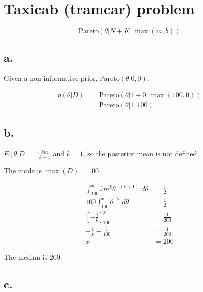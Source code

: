 \documentclass{article}
\begin{document}
\section{Taxicab (tramcar) problem}

\begin{equation}
  \text{Pareto}(\theta|N+K, \max(m,b))  
\end{equation}

\subsection{a.}
Given a non-informative prior, $ \text{Pareto}(\theta|0,0)$:

\begin{align*}
  p(\theta|D) &= \text{Pareto}(\theta|1 + 0, \max(100, 0)) \\
              &= \text{Pareto}(\theta|1, 100)
\end{align*}

\subsection{b.}

$ E[\theta|D] = \frac{km}{k - 1} \text{ and } k = 1$, so the posterior
mean is not defined.

The mode is $\max(D) = 100$.

\begin{align*}
  \int_{100}^x km^k \theta^{-(k+1)} \; d\theta &= \frac{1}{2} \\
  100 \int_{100}^x \theta^{-2} \; d\theta &= \frac{1}{2} \\
  \left[ - \frac{1}{\theta} \right]_{100}^x &= \frac{1}{200} \\
  -  \frac{1}{x} + \frac{1}{100} &= \frac{1}{200} \\
  x &= 200
\end{align*}

The median is 200.

\subsection{c.}
\end{document}

